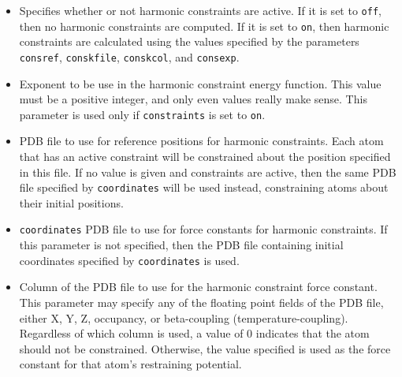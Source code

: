 \begin{itemize}

\item
{}
{Specifies whether or not harmonic constraints are active.  If it 
is set to \verb!off!, then no harmonic constraints are computed.  
If it is set to \verb!on!, then 
harmonic constraints are calculated using the values specified 
by the parameters \verb!consref!, \verb!conskfile!, \verb!conskcol!, 
and \verb!consexp!.}

\item
{}
{Exponent to be use in the harmonic constraint energy function.  
This value must be a positive integer, and only even values really make 
sense.  This parameter is used only if \verb!constraints! is set to 
\verb!on!.}

\item
{}
{PDB file to use for reference positions for harmonic constraints.  
Each atom that has an active constraint will be constrained about 
the position specified in this file.  If no value is given and constraints 
are active, then the same PDB file specified by \verb!coordinates! will be 
used instead, constraining atoms about their initial positions.}

\item
{} {\verb!coordinates!}
{PDB file to use for force constants for 
harmonic constraints.  
If this parameter is not specified, then 
the PDB file containing initial coordinates specified by 
\verb!coordinates! is used.}

\item
{}
{Column of the PDB file to use for the harmonic constraint force constant.
This parameter may specify any of the floating point fields of the PDB file, 
either X, Y, Z, occupancy, or beta-coupling (temperature-coupling).  
Regardless of which column is used, a value of 0 indicates that the atom 
should not be constrained.  
Otherwise, the value specified is used as the force constant for 
that atom's restraining potential.}

\end{itemize}

